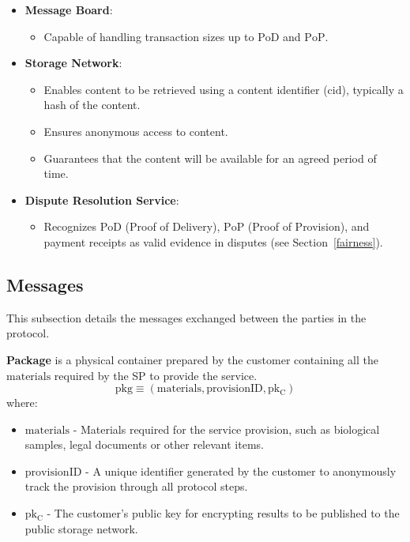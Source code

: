\documentclass[pdftex,twocolumn,epjc3]{svjour3}
\begin{document}
\begin{itemize}
\item \textbf{Message Board}:
  \begin{itemize}
      \item Capable of handling transaction sizes up to $\mathrm{PoD}$ and $\mathrm{PoP}$.
  \end{itemize}

\item \textbf{Storage Network}:
  \begin{itemize}
      \item Enables content to be retrieved using a content identifier ($\mathrm{cid}$), typically a hash of the content.
      \item Ensures anonymous access to content.
      \item Guarantees that the content will be available for an agreed period of time.
  \end{itemize}
  
    
\item \textbf{Dispute Resolution Service}:
    \begin{itemize}
        \item Recognizes $\mathrm{PoD}$ (Proof of Delivery), $\mathrm{PoP}$ (Proof of Provision), and payment receipts as valid evidence in disputes (see Section~\ref{fairness}).
    \end{itemize}
\end{itemize}

\subsection{Messages}\label{messages}
This subsection details the messages exchanged between the parties in the protocol.

\vspace{5mm}

\noindent \textbf{Package}\label{package} is a physical container prepared by the customer containing all the $\mathrm{materials}$ required by the SP to provide the service.
\begin{equation}
\mathrm{pkg} \equiv (\mathrm{materials}, \mathrm{provisionID}, \mathrm{pk_C})
\end{equation}
where:
\begin{itemize}
\item $\mathrm{materials}$ - Materials required for the service provision, such as biological samples, legal documents or other relevant items.
\item $\mathrm{provisionID}$ - A unique identifier generated by the customer to anonymously track the provision through all protocol steps.
\item $\mathrm{pk_C}$ - The customer's public key for encrypting results to be published to the public storage network.
\end{itemize}
\end{document}

